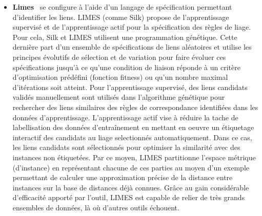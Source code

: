 \begin{itemize}
\item \textbf{Limes}~\cite{Ngomo2011} se configure à l'aide d'un langage de spécification permettant d'identifier les liens. LIMES (comme Silk) propose de l'apprentissage supervisé  et de l'apprentissage actif pour la spécification des règles de liage. Pour cela, Silk et LIMES utilisent une programmation génétique. Cette dernière part d'un ensemble de spécifications de liens aléatoires et utilise les principes évolutifs de sélection et de variation pour faire évoluer ces spécifications jusqu'à ce qu'une condition de liaison réponde à un critère d'optimisation prédéfini (fonction fitness) ou qu'un nombre maximal d'itérations soit atteint. Pour l'apprentissage supervisé, des liens candidats validés manuellement sont utilisés dans l'algorithme génétique pour rechercher des liens similaires des règles de correspondance identifiées dans les données d'apprentissage. L’apprentissage actif vise à réduire la tache de labellisation des données d'entraînement en mettant en oeuvre un étiquetage interactif des candidats au liage selectionnés automatiquement. Dans ce cas, les liens candidats sont sélectionnés pour optimiser la similarité avec des instances non étiquetées. Par ce moyen, LIMES partitionne l'espace métrique (d'instance) en représentant chacune de ces parties au moyen d'un exemple permettant de calculer une approximation précise de la distance entre instances sur la base de distances déjà connues. Grâce au gain considérable d’efficacité apporté par l’outil, LIMES est capable de relier de très grands ensembles de données, là où d’autres outils échouent.\\



\end{itemize}
